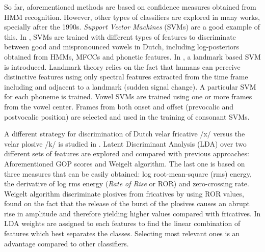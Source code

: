So far, aforementioned methods are based on confidence measures obtained from HMM recognition. 
However, other types of classifiers are explored in many works, specially after
the 1990s. \textit{Support Vector Machines} (SVMs) are a good example of this.
In \cite{detection_mispronunciation_dutch_vowel}, SVMs are trained with different types of
features to discriminate between good and mispronounced vowels in Dutch, including log-posteriors
obtained from HMMs, MFCCs and phonetic features. In \cite{landmark_svm}, a landmark based 
SVM is introduced. Landmark theory relies on the fact that humans can perceive distinctive
features using only spectral features extracted from the time frame including and adjacent to
a landmark (sudden signal change). A particular SVM for each phoneme is trained. Vowel SVMs are 
trained using one or more frames from the vowel center. Frames from both onset and offset
(prevocalic and postvocalic position) are selected and used in the training of consonant
SVMs.

A different strategy for discrimination of Dutch velar fricative /x/ versus the velar plosive
/k/ is studied in \cite{lda_weigelt}. Latent Discriminant Analysis (LDA) over two different sets
of features are explored and compared with previous approaches: Aforementioned GOP scores and
Weigelt algorithm. The last one is based on three measures that can be easily obtained:
log root-mean-square (rms) energy, the derivative of log rms energy (\textit{Rate of Rise} or
ROR) and zero-crossing rate. Weigelt algorithm discriminate plosives from fricatives by using
ROR values, found on the fact that the release of the burst of the plosives causes an abrupt
rise in amplitude and therefore yielding higher values compared with fricatives.
In LDA weights are assigned to each features to find the linear combination of features
which best separates the classes. Selecting most relevant ones is an
advantage compared to other classifiers.

